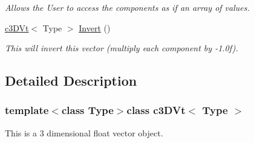 \begin{DoxyCompactItemize}
\begin{DoxyCompactList}\small\item\em Allows the User to access the components as if an array of values. \end{DoxyCompactList}\item 
\hypertarget{classc3_d_vt_a1dab4d9ea46b5b1632cc8d33a2beda4e}{
\hyperlink{classc3_d_vt}{c3DVt}$<$ Type $>$ \hyperlink{classc3_d_vt_a1dab4d9ea46b5b1632cc8d33a2beda4e}{Invert} ()}
\label{classc3_d_vt_a1dab4d9ea46b5b1632cc8d33a2beda4e}

\begin{DoxyCompactList}\small\item\em This will invert this vector (multiply each component by -\/1.0f). \end{DoxyCompactList}\end{DoxyCompactItemize}


\subsection{Detailed Description}
\subsubsection*{template$<$class Type$>$class c3DVt$<$ Type $>$}

This is a 3 dimensional float vector object. 